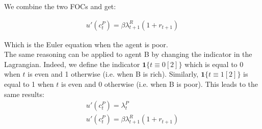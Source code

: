 \documentclass{article}
\begin{document}
We combine the two FOCs and get:

\begin{gather*}
    u'(c_{t}^P)=\beta\lambda_{t+1}^R(1+r_{t+1})
\end{gather*}

Which is the Euler equation when the agent is poor.\\

The same reasoning can be applied to agent B by changing the indicator in the Lagrangian. Indeed, we define the indicator $\mathbf{1}\{t\equiv0[2]\}$ which is equal to 0 when $t$ is even and 1 otherwise (i.e. when B is rich). Similarly, $\mathbf{1}\{t\equiv1[2]\}$ is equal to 1 when $t$ is even and 0 otherwise (i.e. when B is poor). This leads to the same results:
\begin{gather*}
    u'(c_t^P)=\lambda_t^P \\
    u'(c_{t}^P)=\beta\lambda_{t+1}^R(1+r_{t+1})
\end{gather*}


\end{document}
